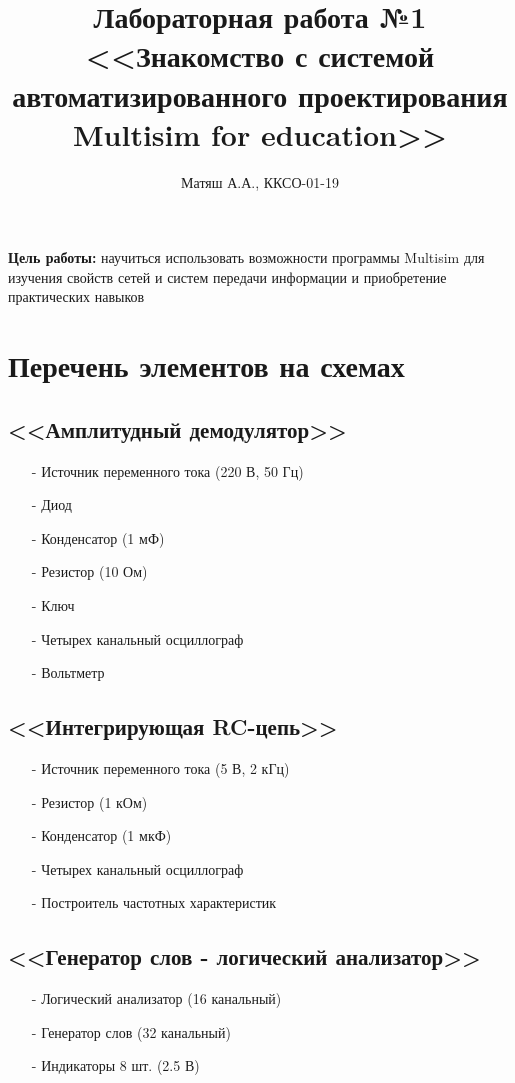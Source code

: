 \documentclass[11pt]{article}
\title{\textbf{Лабораторная работа №1\\<<Знакомство с системой автоматизированного проектирования Multisim for education>>}}
\author{Матяш А.А., ККСО-01-19}
\date{}
\begin{document}
\maketitle
\thispagestyle{empty}
\textbf{Цель работы:} научиться использовать возможности программы Multisim для изучения свойств сетей и систем передачи информации и приобретение практических навыков
\section{Перечень элементов на схемах}
\subsection{<<Амплитудный демодулятор>>}
\begin{itemize}
    \item[-] Источник переменного тока (220 В, 50 Гц)
    \item[-] Диод
    \item[-] Конденсатор (1 мФ)
    \item[-] Резистор (10 Ом)
    \item[-] Ключ
    \item[-] Четырех канальный осциллограф
    \item[-] Вольтметр
\end{itemize}
\subsection{<<Интегрирующая RC-цепь>>}
\begin{itemize}
    \item[-] Источник переменного тока (5 В, 2 кГц)
    \item[-] Резистор (1 кОм)
    \item[-] Конденсатор (1 мкФ)
    \item[-] Четырех канальный осциллограф
    \item[-] Построитель частотных характеристик
\end{itemize}
\subsection{<<Генератор слов - логический анализатор>>}
\begin{itemize}
    \item[-] Логический анализатор (16 канальный)
    \item[-] Генератор слов (32 канальный)
    \item[-] Индикаторы 8 шт. (2.5 В)
\end{itemize}
\end{document}
